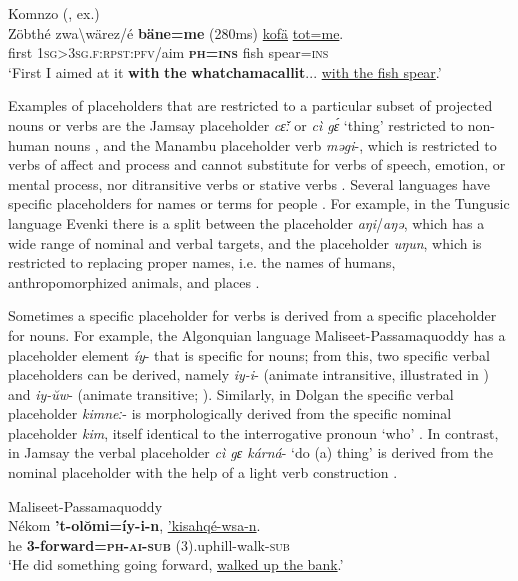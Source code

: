 \documentclass[output=paper]{langscibook}
\begin{document}
\ea \label{ex:intro:3}
{Komnzo (\citealt[\pageref{ex:tot}]{chapters/doehler}, ex.)}\\
\gll Zöbthé zwa{\textbackslash}wärez/é \textbf{bäne=me} (280ms) \uline{kofä} \uline{tot=me}.\\
     first 1\textsc{sg}>\textsc{3sg.f:rpst:pfv}/aim \textbf{\textsc{ph=ins}}  {} fish spear=\textsc{ins}\\
\glt ‘First I aimed at it \textbf{with} \textbf{the} \textbf{whatchamacallit}... \uline{with the fish spear}.’
\z

Examples of placeholders that are restricted to a particular subset of projected nouns or verbs are the Jamsay placeholder \textit{cɛ̌ː} or \textit{cì gɛ́} ‘thing’ restricted to non-human nouns \citep[475]{Heath2008}, and the Manambu placeholder verb \textit{məgi}-, which is restricted to verbs of affect and process and cannot substitute for verbs of speech, emotion, or mental process, nor ditransitive verbs or stative verbs \citep[575]{Aikhenvald2008}. Several languages have specific placeholders for names or terms for people \citep{Vogel2020}. For example, in the Tungusic language Evenki there is a split between the placeholder \textit{aŋi}/\textit{aŋə}, which has a wide range of nominal and verbal targets, and the placeholder \textit{uŋun}, which is restricted to replacing proper names, i.e. the names of humans, anthropomorphized animals, and places \citep[214]{Klyachko2022}. 

Sometimes a specific placeholder for verbs is derived from a specific placeholder for nouns. For example, the Algonquian language Maliseet\hyp Passamaquoddy  has a placeholder element \textit{íy}{}- that is specific for nouns; from this, two specific verbal placeholders can be derived, namely \textit{iy-i}- (animate intransitive, illustrated in ) and \textit{iy-ŭw}- (animate transitive; \citealt{LeSourd2003}). Similarly, in Dolgan the specific verbal placeholder \textit{kimneː}- is morphologically derived from the specific nominal placeholder \textit{kim}, itself identical to the interrogative pronoun ‘who’ \citep{Dabritz2018}. In contrast, in Jamsay the verbal placeholder \textit{cì gɛ kárná}{}- ‘do (a) thing’ is derived from the nominal placeholder with the help of a light verb construction \citep[475]{Heath2008}.

\ea\label{ex:intro:4}
{Maliseet-Passamaquoddy \citep[150]{LeSourd2003}}\\
\gll Nékom \textbf{’t-olŏmi=íy-i-n}, \uline{’kisahqé-wsa-n}.\\
     he \textbf{3-forward=\textsc{ph-ai-sub}} (3).uphill-walk-\textsc{sub}\\
\glt ‘He did something going forward, \uline{walked up the bank}.’
\z
\end{document}
